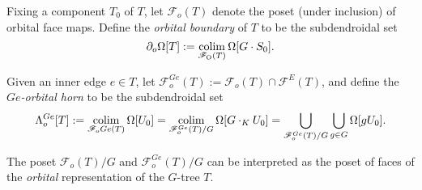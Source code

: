 \documentclass[a4paper,10pt,draft]{article}%
\begin{document}
\begin{definition}
      Fixing a component $T_0$ of $T$,
      let $\mathscr{F}_{o}(T)$ denote the poset (under inclusion) of orbital face maps.
      Define the \textit{orbital boundary} of $T$ to be the subdendroidal set
      \begin{equation}
            \partial_{o}\Omega[T] := \mathop{\operatorname{colim}}\limits_{\mathscr{F}_{\mathrm{O}}(T)}\Omega[G \cdot S_0].
      \end{equation}
      
      Given an inner edge $e \in T$, let
      $\mathscr{F}_{o}^{Ge}(T) := \mathscr{F}_{o}(T) \cap \mathscr{F}^E(T)$,
      and define the \textit{$Ge$-orbital horn} to be the subdendroidal set
      \begin{equation}
            \Lambda^{Ge}_{o}[T] :=
            \mathop{\operatorname{colim}}\limits_{\mathscr{F}_o{Ge}(T)}\Omega[U_0]
            = \mathop{\operatorname{colim}}\limits_{\mathscr{F}_{o}^{Ge}(T)/G}\Omega[G\cdot_K U_0]
            = \mathop{\bigcup}\limits_{\mathscr{F}_o^{Ge}(T)/G} \mathop{\bigcup}\limits_{g \in G}\Omega[g U_0]. 
      \end{equation}
\end{definition}

\begin{remark}
      The poset $\mathscr{F}_o(T)/G$ and $\mathscr{F}_o^{G e}(T)/G$ can be interpreted as
      the poset of faces of the \textit{orbital} representation of the $G$-tree $T$.
\end{remark}
\end{document}
